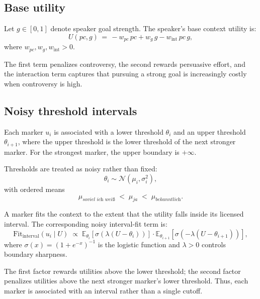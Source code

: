 \documentclass[12pt]{article}
\begin{document}
\subsection{Base utility}

Let $g \in [0,1]$ denote speaker goal strength. The speaker's base context
utility is:
\begin{equation}
U(pc,g)
\,=\,
- w_{pc}\,pc
+ w_g\,g
- w_{\mathrm{int}}\,pc\,g,
\label{eq:model-utility}
\end{equation}
where $w_{pc}, w_g, w_{\mathrm{int}} > 0$.

The first term penalizes controversy, the second rewards persuasive effort,
and the interaction term captures that pursuing a strong goal is increasingly
costly when controversy is high.

\subsection{Noisy threshold intervals}

Each marker $u_i$ is associated with a lower threshold $\theta_i$ and an upper
threshold $\theta_{i+1}$, where the upper threshold is the lower threshold of
the next stronger marker. For the strongest marker, the upper boundary is
$+\infty$.

Thresholds are treated as noisy rather than fixed:
\begin{equation}
\theta_i \sim \mathcal{N}(\mu_i, \sigma_i^2),
\end{equation}
with ordered means
\[
\mu_{\textit{soviel ich wei\ss}}
\;<\;
\mu_{\textit{ja}}
\;<\;
\mu_{\textit{bekanntlich}}.
\]

A marker fits the context to the extent that the utility falls inside its
licensed interval. The corresponding noisy interval-fit term is:
\begin{equation}
\mathrm{Fit}_{\mathrm{interval}}(u_i \mid U)
\;\propto\;
\mathbb{E}_{\theta_i}\left[\sigma\!\left(\lambda(U-\theta_i)\right)\right]
\cdot
\mathbb{E}_{\theta_{i+1}}\left[\sigma\!\left(-\lambda(U-\theta_{i+1})\right)\right],
\label{eq:model-fit}
\end{equation}
where $\sigma(x)=(1+e^{-x})^{-1}$ is the logistic function and $\lambda > 0$
controls boundary sharpness.

The first factor rewards utilities above the lower threshold; the second
factor penalizes utilities above the next stronger marker's lower threshold.
Thus, each marker is associated with an interval rather than a single cutoff.
\end{document}
